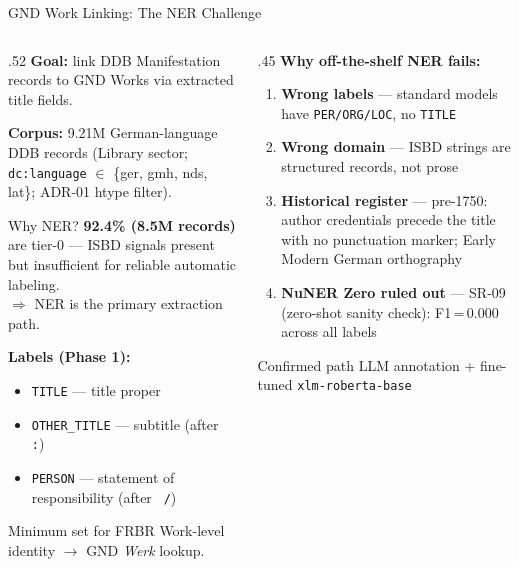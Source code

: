 \documentclass[xcolor,aspectratio=169,compress]{beamer}
\begin{document}
\begin{frame}{GND Work Linking: The NER Challenge}
  \begin{columns}
    \begin{column}{.52\textwidth}
      \textbf{Goal:} link DDB Manifestation records to GND Works
      via extracted title fields.
      \medskip

      \textbf{Corpus:} 9.21M German-language DDB records
      (Library sector; \texttt{dc:language} $\in$ \{ger, gmh, nds, lat\};
      ADR-01 htype filter).
      \medskip

      \begin{block}{Why NER?}
        \textbf{92.4\% (8.5M records)} are tier-0 ---
        ISBD signals present but insufficient for
        reliable automatic labeling.\\
        $\Rightarrow$ NER is the primary extraction path.
      \end{block}
      \medskip

      \textbf{Labels (Phase 1):}
      \begin{itemize}\setlength{\itemsep}{2pt}
        \item \texttt{TITLE} --- title proper
        \item \texttt{OTHER\_TITLE} --- subtitle (after \texttt{ :})
        \item \texttt{PERSON} --- statement of responsibility (after \texttt{ /})
      \end{itemize}
      \smallskip
      \footnotesize
      Minimum set for FRBR Work-level identity
      $\to$ GND \textit{Werk} lookup.
    \end{column}
    \begin{column}{.45\textwidth}
      \textbf{Why off-the-shelf NER fails:}
      \smallskip
      \begin{enumerate}\setlength{\itemsep}{3pt}
        \item \textbf{Wrong labels} --- standard models
              have \texttt{PER/ORG/LOC}, no \texttt{TITLE}
        \item \textbf{Wrong domain} --- ISBD strings are
              structured records, not prose
        \item \textbf{Historical register} ---
              pre-1750: author credentials precede the
              title with no punctuation marker;
              Early Modern German orthography
        \item \textbf{NuNER Zero ruled out} ---
              SR-09 (zero-shot sanity check):
              F1\,=\,0.000 across all labels
      \end{enumerate}
      \smallskip
      \begin{alertblock}{Confirmed path}
        \footnotesize
        LLM annotation + fine-tuned \texttt{xlm-roberta-base}
      \end{alertblock}
    \end{column}
  \end{columns}
\end{frame}
\end{document}
